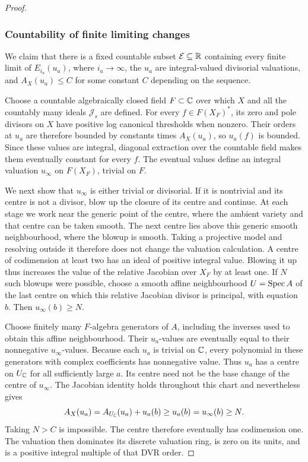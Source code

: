 \begin{proof}
\subsubsection*{Countability of finite limiting changes}
We claim that there is a fixed countable subset $\mathcal E\subseteq\mathbb R$
containing every finite limit of $E_{i_a}(u_a)$, where $i_a\to\infty$,
the $u_a$ are integral-valued divisorial valuations, and
$A_X(u_a)\leq C$ for some constant $C$ depending on the sequence.

Choose a countable algebraically closed field $F\subset\mathbb C$ over which $X$
and all the countably many ideals $\mathcal J_s$ are defined.  For every
$f\in F(X_F)^*$, its zero and pole divisors on $X$ have positive log
canonical thresholds when nonzero.  Their orders at $u_a$ are therefore
bounded by constants times $A_X(u_a)$, so $u_a(f)$ is bounded.  Since these
values are integral, diagonal extraction over the countable field makes
them eventually constant for every $f$.  The eventual values define an
integral valuation $u_\infty$ on $F(X_F)$, trivial on $F$.

We next show that $u_\infty$ is either trivial or divisorial.  If it is
nontrivial and its centre is not a divisor, blow up the closure of its
centre and continue.  At each stage we work near the generic point of the
centre, where the ambient variety and that centre can be taken smooth.
The next centre lies above this generic smooth neighbourhood, where
the blowup is smooth. Taking a projective model and resolving outside
it therefore does not change the valuation calculation.  A centre of codimension at least two has an ideal of
positive integral value.  Blowing it up thus increases the value of the
relative Jacobian over $X_F$ by at least one.  If $N$ such blowups were
possible, choose a smooth affine neighbourhood $U=\operatorname{Spec} A$ of the last
centre on which this relative Jacobian divisor is principal, with equation
$b$.  Then $u_\infty(b)\geq N$.

Choose finitely many $F$-algebra generators of $A$, including the inverses
used to obtain this affine neighbourhood.  Their $u_a$-values are
eventually equal to their nonnegative $u_\infty$-values.  Because each
$u_a$ is trivial on $\mathbb C$, every polynomial in these generators with
complex coefficients has nonnegative value.  Thus $u_a$ has a centre on
$U_\mathbb C$ for all sufficiently large $a$.  Its centre need not be the base
change of the centre of $u_\infty$.  The Jacobian identity holds throughout
this chart and nevertheless gives
\[
 A_X(u_a)=A_{U_\mathbb C}(u_a)+u_a(b)\geq u_a(b)
 =u_\infty(b)\geq N.
\]
Taking $N>C$ is impossible.  The centre therefore eventually has
codimension one.  The valuation then dominates its discrete valuation
ring, is zero on its units, and is a positive integral multiple of that
DVR order.


\end{proof}
